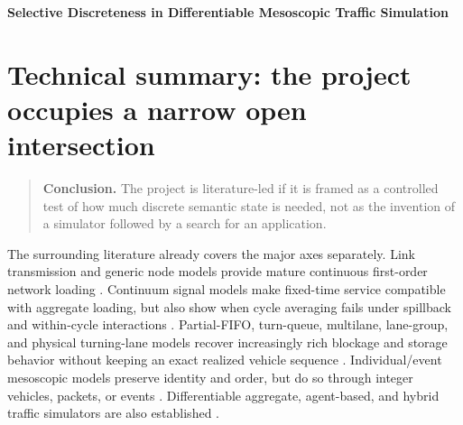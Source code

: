 \documentclass[11pt,a4paper]{article}
\newcommand{\keypoint}[1]{\begin{quote}\colorbox{bluegray}{\parbox{0.93\linewidth}{\textbf{Conclusion.} #1}}\end{quote}}
\begin{document}
\begin{center}
{\LARGE\bfseries Selective Discreteness in Differentiable Mesoscopic Traffic Simulation\par}
\end{center}
\vspace{4pt}

\begin{abstract}
This report asks whether the proposed simulator has a credible literature position, which prior models can serve as baselines, and whether its three mesoscopic additions form a defensible minimal stack. The answer is yes, with a narrow claim. The project should not be presented as the first differentiable traffic simulator, the first differentiable link transmission model, or the first mesoscopic model with routes, lanes, queues, spillback, or vehicle order. Those lines are already mature in isolation. The defensible gap is their intersection: retaining \emph{divisible traffic mass} for an ordinary derivative path while carrying only the exact route/order and localized lane/storage information needed to reproduce signal-relevant mesoscopic effects. The corresponding scientific hypothesis is not that this representation is automatically superior, but that it provides more useful traffic-control sensitivities than matched aggregate alternatives when finite order and accessibility matter. A four-level baseline ladder is required to test that statement without attributing gains prematurely to exact order.
\end{abstract}

\section{Technical summary: the project occupies a narrow open intersection}

\keypoint{The project is literature-led if it is framed as a controlled test of how much discrete semantic state is needed, not as the invention of a simulator followed by a search for an application.}

The surrounding literature already covers the major axes separately. Link transmission and generic node models provide mature continuous first-order network loading \cite{yperman2007,tampere2011}. Continuum signal models make fixed-time service compatible with aggregate loading, but also show when cycle averaging fails under spillback and within-cycle interactions \cite{han2014,yahya2023}. Partial-FIFO, turn-queue, multilane, lane-group, and physical turning-lane models recover increasingly rich blockage and storage behavior without keeping an exact realized vehicle sequence \cite{wright2017,gao2012,liu2011,wei2025,gong2025}. Individual/event mesoscopic models preserve identity and order, but do so through integer vehicles, packets, or events \cite{desouza2025,nietal2026,digangi2016}. Differentiable aggregate, agent-based, and hybrid traffic simulators are also established \cite{osorio2011,andelfinger2021,son2022,seo2026}.
\end{document}
